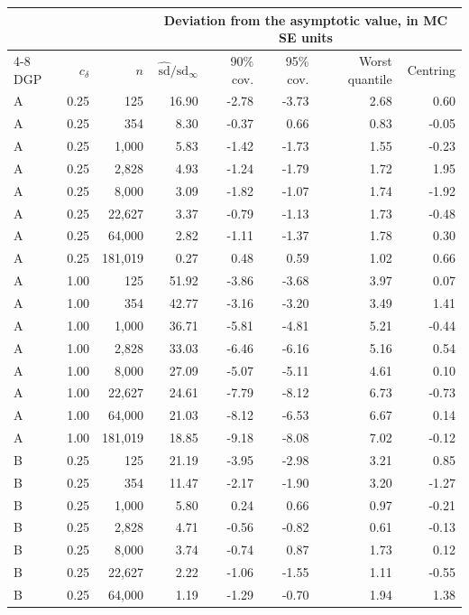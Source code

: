 \begin{tabular}{lrrrrrrr}
\toprule
 & & & \multicolumn{5}{c}{Deviation from the asymptotic value, in MC SE units} \\
\cmidrule(lr){4-8}
DGP & $c_\delta$ & $n$ & $\hat{\mathrm{sd}}/\mathrm{sd}_\infty$ & 90\% cov. & 95\% cov. & Worst quantile & Centring \\
\midrule
A & 0.25 & 125 & 16.90 & -2.78 & -3.73 & 2.68 & 0.60 \\
A & 0.25 & 354 & 8.30 & -0.37 & 0.66 & 0.83 & -0.05 \\
A & 0.25 & 1,000 & 5.83 & -1.42 & -1.73 & 1.55 & -0.23 \\
A & 0.25 & 2,828 & 4.93 & -1.24 & -1.79 & 1.72 & 1.95 \\
A & 0.25 & 8,000 & 3.09 & -1.82 & -1.07 & 1.74 & -1.92 \\
A & 0.25 & 22,627 & 3.37 & -0.79 & -1.13 & 1.73 & -0.48 \\
A & 0.25 & 64,000 & 2.82 & -1.11 & -1.37 & 1.78 & 0.30 \\
A & 0.25 & 181,019 & 0.27 & 0.48 & 0.59 & 1.02 & 0.66 \\
A & 1.00 & 125 & 51.92 & -3.86 & -3.68 & 3.97 & 0.07 \\
A & 1.00 & 354 & 42.77 & -3.16 & -3.20 & 3.49 & 1.41 \\
A & 1.00 & 1,000 & 36.71 & -5.81 & -4.81 & 5.21 & -0.44 \\
A & 1.00 & 2,828 & 33.03 & -6.46 & -6.16 & 5.16 & 0.54 \\
A & 1.00 & 8,000 & 27.09 & -5.07 & -5.11 & 4.61 & 0.10 \\
A & 1.00 & 22,627 & 24.61 & -7.79 & -8.12 & 6.73 & -0.73 \\
A & 1.00 & 64,000 & 21.03 & -8.12 & -6.53 & 6.67 & 0.14 \\
A & 1.00 & 181,019 & 18.85 & -9.18 & -8.08 & 7.02 & -0.12 \\
B & 0.25 & 125 & 21.19 & -3.95 & -2.98 & 3.21 & 0.85 \\
B & 0.25 & 354 & 11.47 & -2.17 & -1.90 & 3.20 & -1.27 \\
B & 0.25 & 1,000 & 5.80 & 0.24 & 0.66 & 0.97 & -0.21 \\
B & 0.25 & 2,828 & 4.71 & -0.56 & -0.82 & 0.61 & -0.13 \\
B & 0.25 & 8,000 & 3.74 & -0.74 & 0.87 & 1.73 & 0.12 \\
B & 0.25 & 22,627 & 2.22 & -1.06 & -1.55 & 1.11 & -0.55 \\
B & 0.25 & 64,000 & 1.19 & -1.29 & -0.70 & 1.94 & 1.38 \\

\end{tabular}
